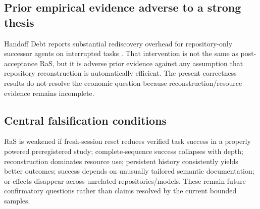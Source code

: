 \subsection{Prior empirical evidence adverse to a strong thesis}

Handoff Debt reports substantial rediscovery overhead for repository-only successor agents on interrupted tasks \citep{kc2026handoff}. That intervention is not the same as post-acceptance RaS, but it is adverse prior evidence against any assumption that repository reconstruction is automatically efficient. The present correctness results do not resolve the economic question because reconstruction/resource evidence remains incomplete.

\subsection{Central falsification conditions}

RaS is weakened if fresh-session reset reduces verified task success in a properly powered preregistered study; complete-sequence success collapses with depth; reconstruction dominates resource use; persistent history consistently yields better outcomes; success depends on unusually tailored semantic documentation; or effects disappear across unrelated repositories/models. These remain future confirmatory questions rather than claims resolved by the current bounded samples.
